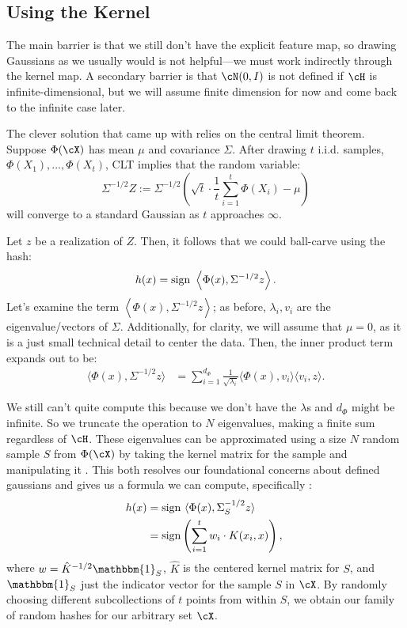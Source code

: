 \documentclass[twoside,11pt]{homework}
\begin{document}
\begin{multicols}{2}
\subsection{Using the Kernel}

The main barrier is that we still don't have the explicit feature map,
so drawing Gaussians as we usually would is not helpful---we must work
indirectly through the kernel map.  A secondary barrier is that
$\cN(0,I)$ is not defined if $\cH$ is infinite-dimensional, but we
will assume finite dimension for now and come back to the infinite
case later.

The clever solution that \cite{K2012} came up with relies on the central limit theorem. Suppose $\Phi(\cX)$ has mean $\mu$ and covariance $\Sigma$. After drawing $t$ i.i.d. samples, $\Phi(X_1),\dotsc, \Phi(X_t)$, CLT implies that the random variable:
\[\Sigma^{-1/2} Z := \Sigma^{-1/2} \left(\sqrt{t} \cdot \frac{1}{t} \sum_{i=1}^t \Phi(X_i) - \mu\right)\]
will converge to a standard Gaussian as $t$ approaches $\infty$.

Let $z$ be a realization of $Z$. Then, it follows that we could ball-carve using the hash:
\[h(x) = \operatorname{sign} \ \left\langle \Phi(x), \Sigma^{-1/2}z\right\rangle.\]
Let's examine the term $\left\langle \Phi(x), \Sigma^{-1/2}z\right\rangle$; as before, $\lambda_i, v_i$ are the eigenvalue/vectors of $\Sigma$. Additionally, for clarity, we will assume that $\mu = 0$, as it is a just small technical detail to center the data. Then, the inner product term expands out to be:
\begin{align*}
  \langle \Phi(x), \Sigma^{-1/2} z\rangle &= \sum_{i=1}^{d_\Phi} \frac{1}{\sqrt{\lambda_i}} \langle \Phi(x), v_i\rangle \langle v_i , z\rangle.
\end{align*}

We still can't quite compute this because we don't have the $\lambda$s
and $d_\Phi$ might be infinite.  So we truncate the operation to $N$
eigenvalues, making a finite sum regardless of $\cH$.  These
eigenvalues can be approximated using a size $N$ random sample $S$ from
$\Phi(\cX)$ by taking the kernel matrix for the sample and
manipulating it \cite{something}.  This both resolves our foundational
concerns about defined gaussians and gives us a formula we can
compute, specifically \cite{K2012}:
\begin{align}
  h(x) &= \operatorname{sign} \ \langle \Phi(x), \Sigma_S^{-1/2} z\rangle \nonumber\\ 
  &= \operatorname{sign}\left(\sum_{i=1}^t w_i \cdot K(x_i, x)\right),\
\end{align}
where $w = \hat{K}^{-1/2}\mathbbm{1}_S$, $\hat{K}$ is the centered kernel matrix for $S$, and $\mathbbm{1}_S$ just the indicator vector for the sample $S$ in $\cX$. By randomly choosing different subcollections of $t$ points from within $S$, we obtain our family of random hashes for our arbitrary set $\cX$.


\end{multicols}
\end{document}
